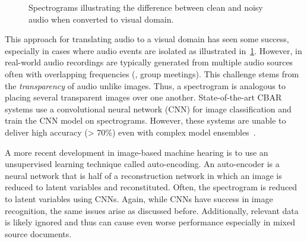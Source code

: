 \begin{figure}[!tbp]
    \centering
    \hfill
    \caption{Spectrograms illustrating the difference between clean and noisy audio when converted to visual domain.}
    \label{fig:noisy-audio-cmpr}
\end{figure}

This approach for translating audio to a visual domain has seen some success,
especially in cases where audio events are isolated as illustrated
in~\cref{fig:noisy-audio-cmpr}.
However, in real-world audio recordings are typically generated from multiple
audio sources often with overlapping frequencies (\eg, group meetings).
This challenge stems from the \textit{transparency} of audio unlike images. 
Thus, a spectrogram is analogous to placing several transparent images 
over one another. 
State-of-the-art CBAR systems use a convolutional neural network (CNN) for 
image classification and
train the CNN model on spectrograms.
However, these systems are unable to deliver high accuracy (> 70\%) even with
complex model ensembles~\cite{xu-large-scale-2018,piczak-environmental-2015}.

A more recent development in image-based machine hearing is to use an
unsupervised learning technique called auto-encoding. An auto-encoder is a
neural network that is half of a reconstruction network in which an image is
reduced to latent variables and reconstituted. Often, the spectrogram is reduced
to latent variables using CNNs. Again, while CNNs have success in image
recognition, the same issues arise as discussed before. Additionally, relevant
data is likely ignored and thus can cause even worse performance especially in
mixed source documents.

